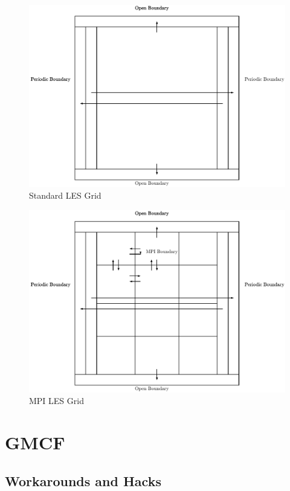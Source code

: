 \documentclass{article}
\begin{document}
\begin{figure}
    \includegraphics[width=\linewidth]{Diagrams/standardLESGrid.pdf}
    \caption{Standard LES Grid}
    \label{fig:standardLESGrid}
\end{figure}

\begin{figure}
    \includegraphics[width=\linewidth]{Diagrams/mpiLESGrid.pdf}
    \caption{MPI LES Grid}
    \label{fig:mpiLESGrid}
\end{figure}

\section{GMCF}

\subsection{Workarounds and Hacks}
\end{document}

